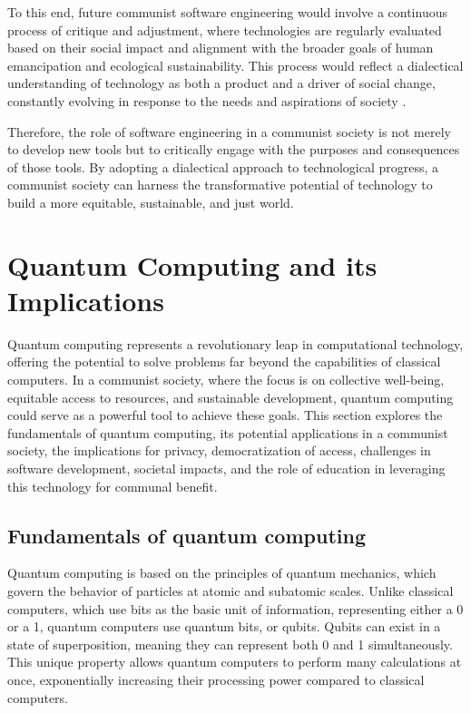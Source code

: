 To this end, future communist software engineering would involve a continuous process of critique and adjustment, where technologies are regularly evaluated based on their social impact and alignment with the broader goals of human emancipation and ecological sustainability. This process would reflect a dialectical understanding of technology as both a product and a driver of social change, constantly evolving in response to the needs and aspirations of society \cite[pp.~315-319]{MarxEngelsTech2025}.

Therefore, the role of software engineering in a communist society is not merely to develop new tools but to critically engage with the purposes and consequences of those tools. By adopting a dialectical approach to technological progress, a communist society can harness the transformative potential of technology to build a more equitable, sustainable, and just world.

\section{Quantum Computing and its Implications}

Quantum computing represents a revolutionary leap in computational technology, offering the potential to solve problems far beyond the capabilities of classical computers. In a communist society, where the focus is on collective well-being, equitable access to resources, and sustainable development, quantum computing could serve as a powerful tool to achieve these goals. This section explores the fundamentals of quantum computing, its potential applications in a communist society, the implications for privacy, democratization of access, challenges in software development, societal impacts, and the role of education in leveraging this technology for communal benefit.

\subsection{Fundamentals of quantum computing}

Quantum computing is based on the principles of quantum mechanics, which govern the behavior of particles at atomic and subatomic scales. Unlike classical computers, which use bits as the basic unit of information, representing either a 0 or a 1, quantum computers use quantum bits, or qubits. Qubits can exist in a state of superposition, meaning they can represent both 0 and 1 simultaneously. This unique property allows quantum computers to perform many calculations at once, exponentially increasing their processing power compared to classical computers.

